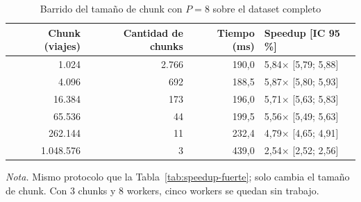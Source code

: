 \begin{table}[H]
\caption{Barrido del tamaño de chunk con $P=8$ sobre el dataset completo}\label{tab:chunk}
\small
\begin{tabular}{@{}rrrl@{}}
\toprule
\textbf{Chunk (viajes)} & \textbf{Cantidad de chunks} & \textbf{Tiempo (ms)} & \textbf{Speedup [IC 95\,\%]} \\
\midrule
1.024 & 2.766 & 190,0 & 5,84$\times$ [5,79; 5,88] \\
4.096 & 692 & 188,5 & 5,87$\times$ [5,80; 5,93] \\
16.384 & 173 & 196,0 & 5,71$\times$ [5,63; 5,83] \\
65.536 & 44 & 199,5 & 5,56$\times$ [5,49; 5,63] \\
262.144 & 11 & 232,4 & 4,79$\times$ [4,65; 4,91] \\
1.048.576 & 3 & 439,0 & 2,54$\times$ [2,52; 2,56] \\
\bottomrule
\end{tabular}

{\footnotesize\textit{Nota.} Mismo protocolo que la Tabla~\ref{tab:speedup-fuerte}; solo cambia el tamaño de chunk. Con 3 chunks y 8 workers, cinco workers se quedan sin trabajo.\par}
\end{table}

